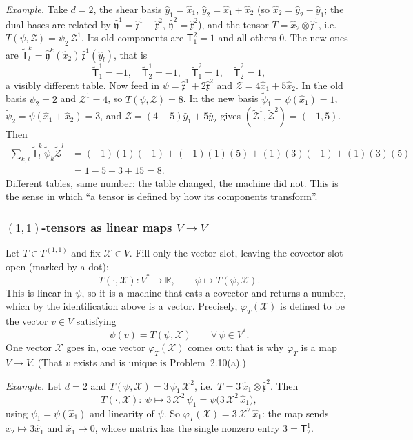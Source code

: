 \documentclass[11pt]{article}
\newcommand{\dual}{V^{*}}
\begin{document}
\smallskip
\noindent\emph{Example.} Take $d=2$, the shear basis $\hat y_1=\hat x_1$, $\hat y_2=\hat x_1+\hat x_2$ (so $\hat x_2=\hat y_2-\hat y_1$; the dual bases are related by $\hat{\mathfrak y}^1=\hat{\mathfrak x}^1-\hat{\mathfrak x}^2$, $\hat{\mathfrak y}^2=\hat{\mathfrak x}^2$), and the tensor $T=\hat x_2\otimes\hat{\mathfrak x}^1$, i.e.\ $T(\psi,\mathcal Z)=\psi_2\,\mathcal Z^1$. Its old components are $\mathsf T^2_1=1$ and all others $0$. The new ones are $\tilde{\mathsf T}^k_l=\hat{\mathfrak y}^k(\hat x_2)\,\hat{\mathfrak x}^1(\hat y_l)$, that is
\[
\tilde{\mathsf T}^1_1=-1,\quad\tilde{\mathsf T}^1_2=-1,\quad\tilde{\mathsf T}^2_1=1,\quad\tilde{\mathsf T}^2_2=1,
\]
a visibly different table. Now feed in $\psi=\hat{\mathfrak x}^1+2\hat{\mathfrak x}^2$ and $\mathcal Z=4\hat x_1+5\hat x_2$. In the old basis $\psi_2=2$ and $\mathcal Z^1=4$, so $T(\psi,\mathcal Z)=8$. In the new basis $\tilde\psi_1=\psi(\hat x_1)=1$, $\tilde\psi_2=\psi(\hat x_1+\hat x_2)=3$, and $\mathcal Z=(4-5)\hat y_1+5\hat y_2$ gives $(\tilde{\mathcal Z}^1,\tilde{\mathcal Z}^2)=(-1,5)$. Then
\begin{align*}
\sum_{k,l}\tilde{\mathsf T}^k_l\,\tilde\psi_k\tilde{\mathcal Z}^l&=(-1)(1)(-1)+(-1)(1)(5)+(1)(3)(-1)+(1)(3)(5)\\
&=1-5-3+15=8.
\end{align*}
Different tables, same number: the table changed, the machine did not. This is the sense in which ``a tensor is defined by how its components transform''.

\subsubsection*{$(1,1)$-tensors as linear maps $V\to V$}
Let $T\in T^{(1,1)}$ and fix $\mathcal X\in V$. Fill only the vector slot, leaving the covector slot open (marked by a dot):
\[
T(\cdot,\mathcal X):\dual\to\mathbb R,\qquad\psi\mapsto T(\psi,\mathcal X).
\]
This is linear in $\psi$, so it is a machine that eats a covector and returns a number, which by the identification above is a vector. Precisely, $\varphi_T(\mathcal X)$ is defined to be the vector $v\in V$ satisfying
\[
\psi(v)=T(\psi,\mathcal X)\qquad\forall\,\psi\in\dual.
\]
One vector $\mathcal X$ goes in, one vector $\varphi_T(\mathcal X)$ comes out: that is why $\varphi_T$ is a map $V\to V$. (That $v$ exists and is unique is Problem~2.10(a).)

\smallskip
\noindent\emph{Example.} Let $d=2$ and $T(\psi,\mathcal X)=3\,\psi_1\,\mathcal X^2$, i.e.\ $T=3\,\hat x_1\otimes\hat{\mathfrak x}^2$. Then
\[
T(\cdot,\mathcal X):\ \psi\mapsto 3\,\mathcal X^2\,\psi_1=\psi\big(3\,\mathcal X^2\,\hat x_1\big),
\]
using $\psi_1=\psi(\hat x_1)$ and linearity of $\psi$. So $\varphi_T(\mathcal X)=3\,\mathcal X^2\,\hat x_1$: the map sends $\hat x_2\mapsto3\hat x_1$ and $\hat x_1\mapsto0$, whose matrix has the single nonzero entry $3=\mathsf T^1_2$.
\end{document}
